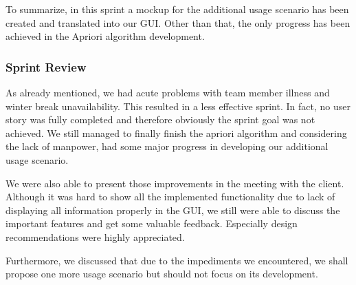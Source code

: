 To summarize, in this sprint a mockup for the additional usage scenario has been created and translated into our GUI. Other than that, the only progress has been achieved in the Apriori algorithm development.

\subsubsection*{Sprint Review}

As already mentioned, we had acute problems with team member illness and winter break unavailability. This resulted in a less effective sprint. In fact, no user story was fully completed and therefore obviously the sprint goal was not achieved.
We still managed to finally finish the apriori algorithm and considering the lack of manpower, had some major progress in developing our additional usage scenario.  

We were also able to present those improvements in the meeting with the client. Although it was hard to show all the implemented functionality due to lack of displaying all information properly in the GUI, we still were able to discuss the important features and get some valuable feedback. Especially design recommendations were highly appreciated.

Furthermore, we discussed that due to the impediments we encountered, we shall propose one more usage scenario but should not focus on its development.



